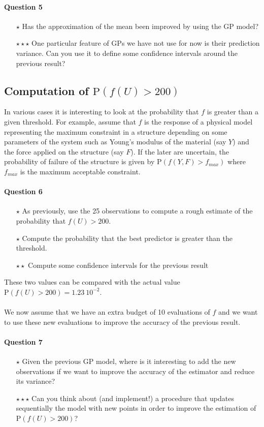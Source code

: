 \documentclass{article}
\begin{document}
\paragraph{Question 5}
\begin{itemize}
 \item[$\star$] Has the approximation of the mean been improved by using the GP model?
 \item[$\star \star \star$] One particular feature of GPs we have not use for now is their prediction variance. Can you use it to define some confidence intervals around the previous result?
\end{itemize}

\subsection{Computation of $\mathrm{P}(f(U)>200)$}
In various cases it is interesting to look at the probability that $f$ is greater than a given threshold. For example, assume that $f$ is the response of a physical model representing the maximum constraint in a structure depending on some parameters of the system such as Young's modulus of the material (say $Y$) and the force applied on the structure (say $F$). If the later are uncertain, the probability of failure of the structure is given by $\mathrm{P}(f(Y,F)>f_{max})$ where $f_{max}$ is the maximum acceptable constraint.

\paragraph{Question 6}
\begin{itemize}
 \item[$\star$] As previously, use the 25 observations to compute a rough estimate of the probability that $f(U)>200$.
 \item[$\star$] Compute the probability that the best predictor is greater than the threshold.
 \item[$\star \star$] Compute some confidence intervals for the previous result
\end{itemize}
These two values can be compared with the actual value $\mathrm{P}(f(U)>200) = 1.23\ 10^{-2}$.

\paragraph{}
We now assume that we have an extra budget of 10 evaluations of $f$ and we want to use these new evaluations to improve the accuracy of the previous result.
\paragraph{Question 7}
\begin{itemize}
 \item[$\star$] Given the previous GP model, where is it interesting to add the new observations if we want to improve the accuracy of the estimator and reduce its variance?
 \item[$\star \star \star$] Can you think about (and implement!) a procedure that updates sequentially the model with new points in order to improve the estimation of $\mathrm{P}(f(U)>200)$?
\end{itemize}
\end{document}
